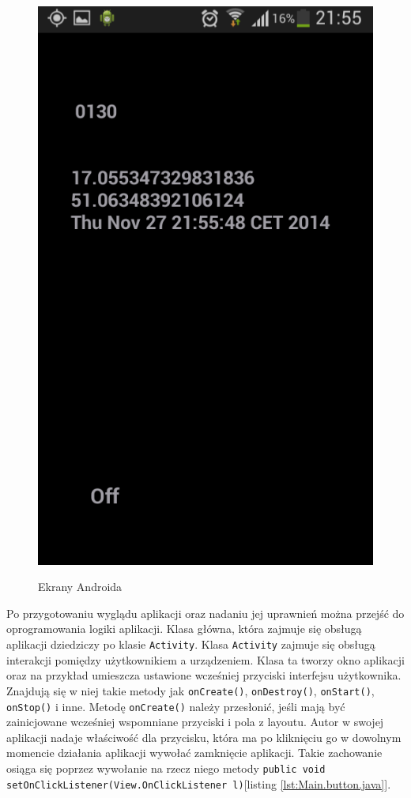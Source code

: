 \documentclass[eng,printmode,oneside]{mgr}
\begin{document}
\begin{figure}
{\includegraphics[height=0.33\textheight]{andLokal.png}
}
\caption{Ekrany Androida }
\label{fig:androidViewOK}
\vspace{-10pt}
\end{figure}

Po przygotowaniu wyglądu aplikacji oraz nadaniu jej uprawnień można przejść
do oprogramowania logiki aplikacji. Klasa główna, która zajmuje się obsługą
aplikacji dziedziczy po klasie \texttt{Activity}. Klasa \texttt{Activity} zajmuje
się obsługą interakcji pomiędzy użytkownikiem a urządzeniem. Klasa ta tworzy okno aplikacji
oraz na przykład umieszcza ustawione wcześniej przyciski interfejsu użytkownika.
Znajdują się w niej takie metody jak \texttt{onCreate()}, \texttt{onDestroy()},
\texttt{onStart()}, \texttt{onStop()} i inne. Metodę \texttt{onCreate()} należy
przesłonić, jeśli mają być zainicjowane wcześniej wspomniane przyciski i pola z layoutu. Autor w swojej aplikacji nadaje
właściwość dla przycisku, która ma po kliknięciu go w dowolnym momencie
działania aplikacji wywołać zamknięcie aplikacji. Takie zachowanie osiąga się
poprzez wywołanie na rzecz niego metody \texttt{public void
setOnClickListener(View.OnClickListener l)}[listing \ref{lst:Main.button.java}].
\end{document}
